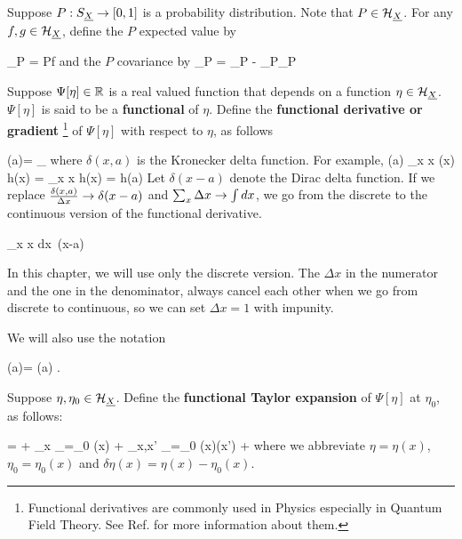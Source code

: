 Suppose $P:S_{\underline{X}}\rightarrow [0,1]$
is a probability distribution.
Note that $P\in{\cal H}_{\underline{X}}$.
For any $f,g\in{\cal H}_{\underline{X}}$,
define the $P$ expected value by

\beq
{}_P = P\cdot f
\eeq
and the $P$ covariance by
\beq
{}_P =
_P - _P_P
\eeq

Suppose $\Psi[\eta]\in{ \mathbb{R}}$
is a real valued function
that depends on a function $\eta\in {\cal H}_{\underline{X}}$.
$\Psi[\eta]$ is said to be a {\bf functional} of $\eta$.
Define the
{\bf functional derivative or gradient }\footnote{
Functional derivatives are commonly used in Physics
especially in Quantum Field Theory.
See Ref.\cite{wiki-func-deri} for more
information about them.}
of $\Psi[\eta]$ with respect to $\eta$, as follows


\beq
\frac{\delta \Psi[\eta]}
{\delta \eta(a)}=
\lim_{\eps{}}
{\eps}
\eeq
where $\delta(x,a)$ is the Kronecker delta function.
For example,
\beq
\frac{\delta}
{\delta \eta(a)}
\sum_x \Delta x\; \eta(x) h(x)
=
\sum_x \Delta x  h(x)
=
h(a)
\eeq
 Let
$\delta(x-a)$ denote the Dirac delta function. If we replace
$\frac{\delta(x,a)}{\Delta x}\rightarrow\delta(x-a)$
and $\sum_x \Delta x\rightarrow \int dx$, we go
from the discrete to the continuous version
of the functional derivative.

\beq
\sum_x \Delta x 
\rarrow \int dx\, \delta(x-a)
\eeq

In this chapter, we will use only the discrete version.
The $\Delta x$ in the numerator
and the one in the denominator, always cancel
each other when we go from discrete
to continuous, so we can
set
$\Delta x=1$ with impunity.



We will also use the notation

\beq
\dpsi[\eta](a)=
\frac{\delta \Psi[\eta]}
{\delta \eta(a)}
\;.
\eeq

Suppose $\eta, \eta_0\in {\cal H}_{\underline{X}}$. Define the
{\bf functional Taylor expansion} of $\Psi[\eta]$
at $\eta_0$, as follows:

\beq
\Psi[\eta]=
\Psi[\eta_0]
+ \sum_x
_{\eta=\eta_0}
\delta\eta(x)
+
\sum_{x,x'}
_{\eta=\eta_0}
\delta\eta(x)\delta\eta(x')
+
\cdots
\eeq
where we abbreviate
$ \eta =\eta(x)$,
$\eta_0=\eta_0(x)$ and $\delta \eta(x) = \eta(x)-\eta_0(x)$.



